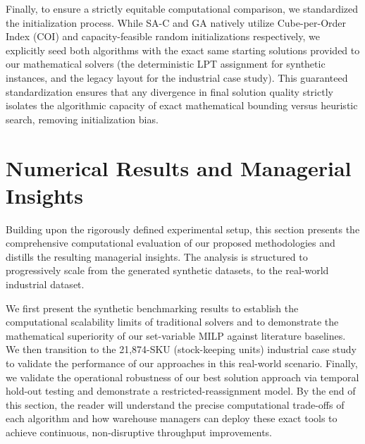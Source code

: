\documentclass[preprint,review,11pt,authoryear]{elsarticle}
\begin{document}
Finally, to ensure a strictly equitable computational comparison, we standardized the initialization process. While SA-C and GA natively utilize Cube-per-Order Index (COI) and capacity-feasible random initializations respectively, we explicitly seed both algorithms with the exact same starting solutions provided to our mathematical solvers (the deterministic LPT assignment for synthetic instances, and the legacy layout for the industrial case study). This guaranteed standardization ensures that any divergence in final solution quality strictly isolates the algorithmic capacity of exact mathematical bounding versus heuristic search, removing initialization bias.


\section{Numerical Results and Managerial Insights}
\label{sec:numerical_results}

Building upon the rigorously defined experimental setup, this section presents the comprehensive computational evaluation of our proposed methodologies and distills the resulting managerial insights. The analysis is structured to progressively scale from the generated synthetic datasets, to the real-world industrial dataset. 

We first present the synthetic benchmarking results to establish the computational scalability limits of traditional solvers and to demonstrate the mathematical superiority of our set-variable MILP against literature baselines. We then transition to the 21,874-SKU (stock-keeping units) industrial case study to validate the performance of our approaches in this real-world scenario. Finally, we validate the operational robustness of our best solution approach via temporal hold-out testing and demonstrate a restricted-reassignment model. By the end of this section, the reader will understand the precise computational trade-offs of each algorithm and how warehouse managers can deploy these exact tools to achieve continuous, non-disruptive throughput improvements.
\end{document}
